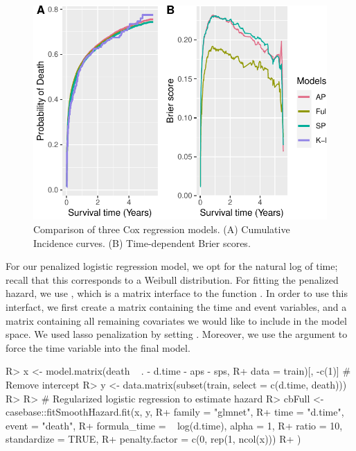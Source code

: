 \documentclass[
]{jss}
\begin{document}
\begin{CodeChunk}
\begin{figure}

{\centering \includegraphics{../figures/brierpt1-1} 

}

\caption{\label{fig:brier1} Comparison of three Cox regression models. (A) Cumulative Incidence curves. (B) Time-dependent Brier scores.}\label{fig:brierpt1}
\end{figure}
\end{CodeChunk}

For our penalized logistic regression model, we opt for the natural log
of time; recall that this corresponds to a Weibull distribution. For
fitting the penalized hazard, we use , which
is a matrix interface to the function . In order
to use this interfact, we first create a matrix  containing the
time and event variables, and a matrix  containing all remaining
covariates we would like to include in the model space. We used lasso
penalization by setting . Moreover, we use the argument
 to force the time variable into the final model.

\begin{CodeChunk}

\begin{CodeInput}
R> x <- model.matrix(death ~ . - d.time - aps - sps, 
R+                   data = train)[, -c(1)] # Remove intercept
R> y <- data.matrix(subset(train, select = c(d.time, death)))
R> 
R> # Regularized logistic regression to estimate hazard
R> cbFull <- casebase::fitSmoothHazard.fit(x, y,
R+   family = "glmnet",
R+   time = "d.time", event = "death",
R+   formula_time = ~ log(d.time), alpha = 1,
R+   ratio = 10, standardize = TRUE,
R+   penalty.factor = c(0, rep(1, ncol(x)))
R+ )
\end{CodeInput}
\end{CodeChunk}
\end{document}
